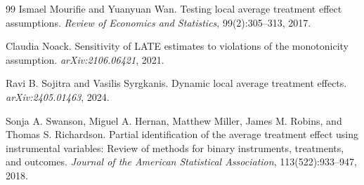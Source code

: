 \documentclass[11pt]{article}
\theoremstyle{definition}
\theoremstyle{plain}
\theoremstyle{remark}
\begin{document}
\begin{thebibliography}{99}
Ismael Mourifie and Yuanyuan Wan.
\newblock Testing local average treatment effect assumptions.
\newblock \emph{Review of Economics and Statistics}, 99(2):305--313, 2017.

Claudia Noack.
\newblock Sensitivity of LATE estimates to violations of the monotonicity assumption.
\newblock \emph{arXiv:2106.06421}, 2021.

Ravi B. Sojitra and Vasilis Syrgkanis.
\newblock Dynamic local average treatment effects.
\newblock \emph{arXiv:2405.01463}, 2024.

Sonja A. Swanson, Miguel A. Hernan, Matthew Miller, James M. Robins, and Thomas S. Richardson.
\newblock Partial identification of the average treatment effect using instrumental variables: Review of methods for binary instruments, treatments, and outcomes.
\newblock \emph{Journal of the American Statistical Association}, 113(522):933--947, 2018.
\end{thebibliography}
\end{document}

